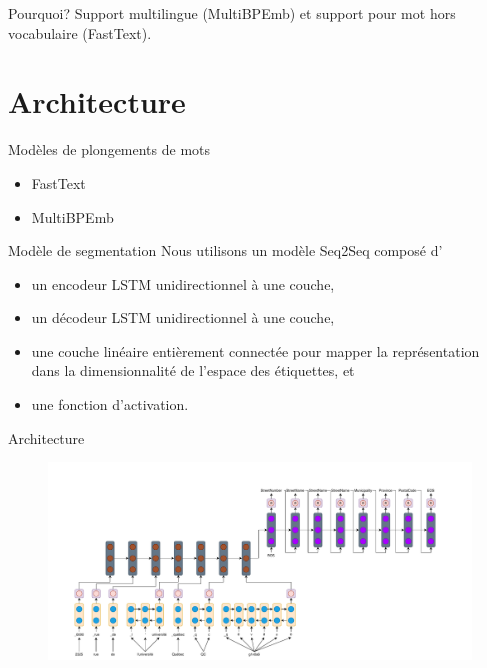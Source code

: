 \documentclass{beamer}
\begin{document}
	\begin{frame}{Pourquoi?}
		Support multilingue (MultiBPEmb) et support pour mot hors vocabulaire (FastText).
	\end{frame}
	
	\section{Architecture}
	\begin{frame}{Modèles de plongements de mots}
		\begin{itemize}
			\item FastText
			\item MultiBPEmb
		\end{itemize}
	\end{frame}
	
	\begin{frame}{Modèle de segmentation}
		Nous utilisons un modèle Seq2Seq composé d'
		\begin{itemize}
			\item<2-> un encodeur LSTM unidirectionnel à une couche,
			\item<3-> un décodeur LSTM unidirectionnel à une couche,
			\item<4-> une couche linéaire entièrement connectée pour mapper la représentation dans la dimensionnalité de l'espace des étiquettes, et
			\item<5-> une fonction d'activation. 
		\end{itemize}
		
	\end{frame}
	
	\begin{frame}{Architecture}
		\begin{figure}[h!]
			\centering
			\includegraphics[width=1.1\textwidth,height=\textheight,keepaspectratio]{Network.pdf}
		\end{figure}
	\end{frame}
	
\end{document}
